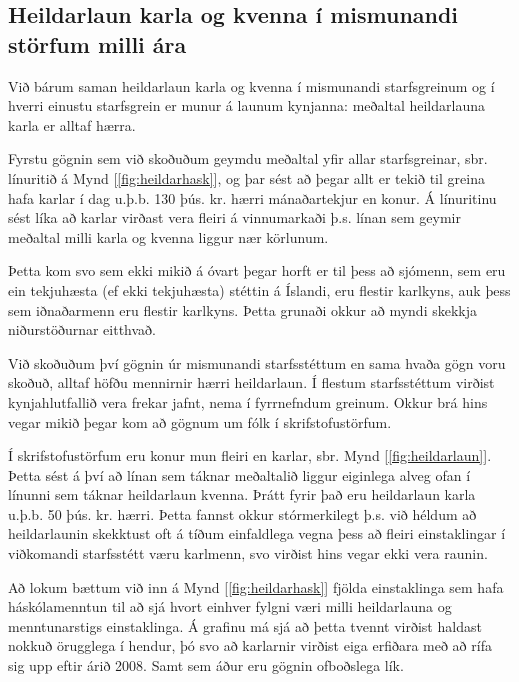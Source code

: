 \subsection{Heildarlaun karla og kvenna í mismunandi störfum milli ára}
Við bárum saman heildarlaun karla og kvenna í mismunandi starfsgreinum og í hverri einustu starfsgrein er munur á launum kynjanna: meðaltal heildarlauna karla er alltaf hærra.

Fyrstu gögnin sem við skoðuðum geymdu meðaltal yfir allar starfsgreinar, sbr. línuritið á Mynd [\ref{fig:heildarhask}], og þar sést að þegar allt er tekið til greina hafa karlar í dag u.þ.b. 130 þús. kr. hærri mánaðartekjur en konur. Á línuritinu sést líka að karlar virðast vera fleiri á vinnumarkaði þ.s. línan sem geymir meðaltal milli karla og kvenna liggur nær körlunum.

Þetta kom svo sem ekki mikið á óvart þegar horft er til þess að sjómenn, sem eru ein tekjuhæsta (ef ekki tekjuhæsta) stéttin á Íslandi, eru flestir karlkyns, auk þess sem iðnaðarmenn eru flestir karlkyns. Þetta grunaði okkur að myndi skekkja niðurstöðurnar eitthvað.

Við skoðuðum því gögnin úr mismunandi starfsstéttum en sama hvaða gögn voru skoðuð, alltaf höfðu mennirnir hærri heildarlaun. Í flestum starfsstéttum virðist kynjahlutfallið vera frekar jafnt, nema í fyrrnefndum greinum. Okkur brá hins vegar mikið þegar kom að gögnum um fólk í skrifstofustörfum.

Í skrifstofustörfum eru konur mun fleiri en karlar, sbr. Mynd [\ref{fig:heildarlaun}]. Þetta sést á því að línan sem táknar meðaltalið liggur eiginlega alveg ofan í línunni sem táknar heildarlaun kvenna. Þrátt fyrir það eru heildarlaun karla u.þ.b. 50 þús. kr. hærri. Þetta fannst okkur stórmerkilegt þ.s. við héldum að heildarlaunin skekktust oft á tíðum einfaldlega vegna þess að fleiri einstaklingar í viðkomandi starfsstétt væru karlmenn, svo virðist hins vegar ekki vera raunin.

Að lokum bættum við inn á Mynd [\ref{fig:heildarhask}] fjölda einstaklinga sem hafa háskólamenntun til að sjá hvort einhver fylgni væri milli heildarlauna og menntunarstigs einstaklinga. Á grafinu má sjá að þetta tvennt virðist haldast nokkuð örugglega í hendur, þó svo að karlarnir virðist eiga erfiðara með að rífa sig upp eftir árið 2008. Samt sem áður eru gögnin ofboðslega lík.